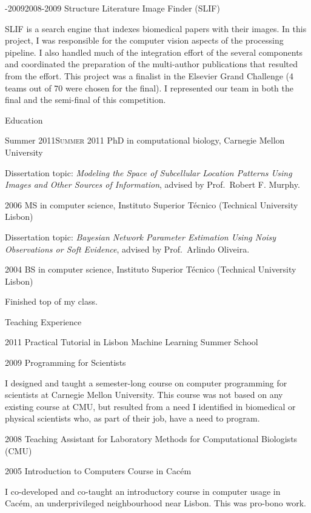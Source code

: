 \documentclass{article}
\renewcommand\section[1]{%
    \par\vspace{2em}%
    {\subhead #1}%
    \par\vspace{1em}%
}
\newcommand\cvitem[2][\relax]{%
    \par\vspace{.8em}
    \if\relax#1\else\textsc{#1}\hspace{1em}\fi%
    {\Textblack #2}%
    \par\vspace{.4em}
}
\begin{document}
\cvitem[2008-2009]{Structure Literature Image Finder (SLIF)}
SLIF is a search engine that indexes biomedical papers with their images. In
this project, I was responsible for the computer vision aspects of the
processing pipeline. I also handled much of the integration effort of the
several components and coordinated the preparation of the multi-author
publications that resulted from the effort. This project was a finalist in the
Elsevier Grand Challenge (4 teams out of 70 were chosen for the final). I
represented our team in both the final and the semi-final of this competition.

\section{Education}

\cvitem[Summer 2011]{PhD in computational biology, Carnegie Mellon University}
Dissertation topic: \emph{Modeling the Space of Subcellular Location Patterns
Using Images and Other Sources of Information}, advised by Prof.\ Robert F.
Murphy.

\cvitem[2006]{MS in computer science, Instituto Superior T\'ecnico (Technical University Lisbon)}
Dissertation topic: \emph{Bayesian Network Parameter Estimation Using Noisy
Observations or Soft Evidence}, advised by Prof.\ Arlindo Oliveira.

\cvitem[2004]{BS in computer science, Instituto Superior T\'ecnico (Technical University Lisbon)}
Finished top of my class.

\section{Teaching Experience}

\cvitem[2011]{Practical Tutorial in Lisbon Machine Learning Summer School}

\cvitem[2009]{Programming for Scientists}
I designed and taught a semester-long course on computer programming for
scientists at Carnegie Mellon University. This course was not based on any
existing course at CMU, but resulted from a need I identified in biomedical or
physical scientists who, as part of their job, have a need to program.

\cvitem[2008]{Teaching Assistant for Laboratory Methods for Computational Biologists (CMU)}
\cvitem[2005]{Introduction to Computers Course in Cac\'em}
I co-developed and co-taught an introductory course in computer usage in
Cac\'em, an underprivileged neighbourhood near Lisbon. This was pro-bono work.
\end{document}
